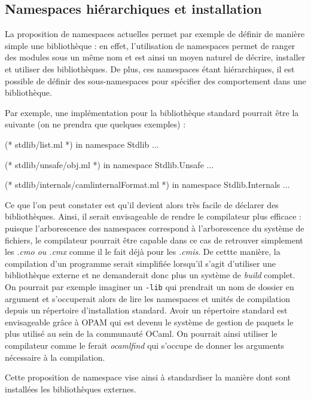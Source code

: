 \documentclass[11pt,a4paper]{report}
\begin{document}
\subsection{Namespaces hiérarchiques et installation}

La proposition de namespaces actuelles permet par exemple de définir de manière
simple une bibliothèque : en effet, l'utilisation de namespaces permet de ranger
des modules sous un même nom et est ainsi un moyen naturel de décrire, installer
et utiliser des bibliothèques. De plus, ces namespaces étant hiérarchiques, il
est possible de définir des sous-namespaces pour spécifier des comportement dans
une bibliothèque.

Par exemple, une implémentation pour la bibliothèque standard pourrait être la
suivante (on ne prendra que quelques exemples) :
\begin{OCaml}
(* stdlib/list.ml *)
in namespace Stdlib
...
\end{OCaml}

\begin{OCaml}
(* stdlib/unsafe/obj.ml *)
in namespace Stdlib.Unsafe
...
\end{OCaml}

\begin{OCaml}
(* stdlib/internals/camlinternalFormat.ml *)
in namespace Stdlib.Internals
...
\end{OCaml}

Ce que l'on peut constater est qu'il devient alors très facile de déclarer des
bibliothèques. Ainsi, il serait envisageable de rendre le compilateur plus
efficace : puisque l'arborescence des namespaces correspond à l'arborescence du
système de fichiers, le compilateur pourrait être capable dans ce cas de
retrouver simplement les \emph{.cmo ou .cmx} comme il le fait déjà pour les
\emph{.cmis}. De cettte manière, la compilation d'un programme serait simplifiée
lorsqu'il s'agit d'utiliser une bibliothèque externe et ne demanderait donc plus
un système de \emph{build} complet. On pourrait par exemple imaginer un
\texttt{-lib} qui prendrait un nom de dossier en argument et s'occuperait alors
de lire les namespaces et unités de compilation depuis un répertoire
d'installation standard. Avoir un répertoire standard est envisageable grâce à
OPAM qui est devenu le système de gestion de paquets le plus utilisé au sein de
la communauté OCaml. On pourrait ainsi utiliser le compilateur comme le ferait
\emph{ocamlfind} qui s'occupe de donner les arguments nécessaire à la compilation.

Cette proposition de namespace vise ainsi à standardiser la manière dont sont
installées les bibliothèques externes.
\end{document}
